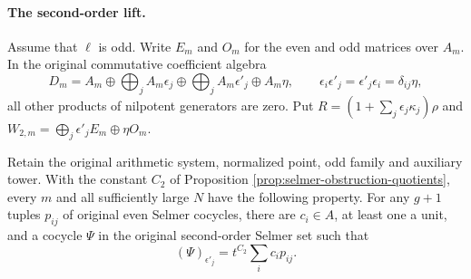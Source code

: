 \paragraph{The second-order lift.}
Assume that $\ell$ is odd. Write $E_m$ and $O_m$ for the even and
odd matrices over $A_m$. In the original commutative coefficient
algebra
\[
 D_m=A_m\oplus\bigoplus_j A_m\epsilon_j
       \oplus\bigoplus_j A_m\epsilon'_j\oplus A_m\eta,\qquad
 \epsilon_i\epsilon'_j=\epsilon'_j\epsilon_i=\delta_{ij}\eta,
\]
all other products of nilpotent generators are zero. Put
$R=(1+\sum_j\epsilon_j\kappa_j)\rho$ and
$W_{2,m}=\bigoplus_j\epsilon'_jE_m\oplus\eta O_m$.

\begin{proposition}
\label{prop:selmer-second-global-bound}
Retain the original arithmetic system, normalized point, odd family
and auxiliary tower. With the constant $C_2$ of Proposition
\ref{prop:selmer-obstruction-quotients}, every $m$ and all sufficiently
large $N$ have the following property. For any $g+1$ tuples
$p_{ij}$ of original even Selmer cocycles, there are $c_i\in A$,
at least one a unit, and a cocycle $\Psi$ in the original
second-order Selmer set such that
\[
                   (\Psi)_{\epsilon'_j}
                      =t^{C_2}\sum_i c_i p_{ij}.
\]
\end{proposition}

